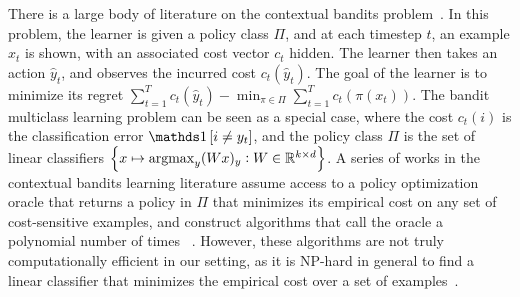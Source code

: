 

There is a large body of literature on the contextual bandits
problem~\citep{Auer-2003, Langford-Zhang-2008}. In this problem, the learner is
given a policy class $\Pi$, and at each timestep $t$, an example $x_t$ is shown,
with an associated cost vector $c_t$ hidden. The learner then takes an action
$\widehat{y}_t$, and observes the incurred cost $c_t(\widehat{y}_t)$. The goal
of the learner is to minimize its regret $\sum_{t=1}^T c_t(\widehat{y}_t) -
\min_{\pi \in \Pi} \sum_{t=1}^T c_t(\pi(x_t))$.
The bandit multiclass
learning problem can be seen as a special case,
where the
cost $c_t(i)$ is the classification error $\indicator{i \neq y_t}$, and the
policy class $\Pi$ is the set of linear classifiers $\cbr{x \mapsto \argmax_y
(Wx)_y: W \in \R^{k \times d}}$. A series of works in the contextual bandits
learning literature 
assume access to
a policy optimization oracle that returns a policy in $\Pi$ that minimizes
its empirical cost on any set of cost-sensitive examples, and 
construct algorithms that call 
the oracle a polynomial number of times%
~\citep{Dudik-Hsu-Kale-Karampatziakis-Langford-Reyzin-Zhang-2011,
Agarwal-Hsu-Kale-Langford-Li-Schapire-2014, Rakhlin-Sridharan-2016,
Syrgkanis-Krishnamurthy-Schapire-2016,
Syrgkanis-Luo-Krishnamurthy-Schapire-2016}.
However, these algorithms are not
truly computationally efficient in our setting, as it is NP-hard in general to
find a linear classifier that minimizes the empirical cost over a set of
examples~\citep{Arora-Babai-Stern-Sweedyk-1997}.


